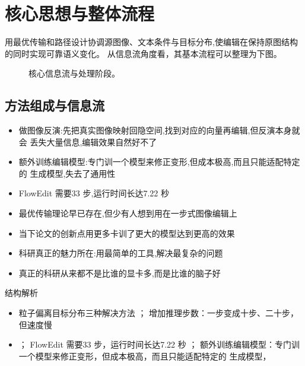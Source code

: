 \documentclass[UTF8,11pt,a4paper]{ctexart}
\begin{document}
\section{核心思想与整体流程}
用最优传输和路径设计协调源图像、文本条件与目标分布,使编辑在保持原图结构的同时实现可靠语义变化。 从信息流角度看，其基本流程可以整理为下图。

\begin{figure}[H]
\centering
{}
\caption{核心信息流与处理阶段。}
\end{figure}

\subsection{方法组成与信息流}
\begin{itemize}
\item 做图像反演:先把真实图像映射回隐空间,找到对应的向量再编辑,但反演本身就会 丢失大量信息,编辑效果自然好不了
\item 额外训练编辑模型:专门训一个模型来修正变形,但成本极高,而且只能适配特定的 生成模型,失去了通用性
\item FlowEdit 需要33 步,运行时间长达7.22 秒
\item 最优传输理论早已存在,但少有人想到用在一步式图像编辑上
\item 当下论文的创新点用更多卡训了更大的模型达到更高的效果
\item 科研真正的魅力所在:用最简单的工具,解决最复杂的问题
\item 真正的科研从来都不是比谁的显卡多,而是比谁的脑子好
\end{itemize}

\begin{keybox}{结构解析}
\begin{itemize}
\item 粒子偏离目标分布三种解决方法 ； 增加推理步数：一步变成十步、二十步，但速度慢
\item ； FlowEdit 需要33 步，运行时间长达7.22 秒 ； 额外训练编辑模型：专门训一个模型来修正变形，但成本极高，而且只能适配特定的 生成模型，
\end{itemize}
\end{keybox}
\end{document}
